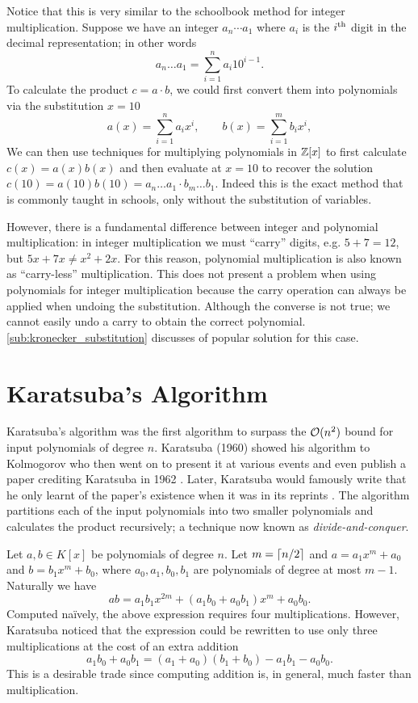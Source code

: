Notice that this is very similar to the schoolbook method for integer multiplication. Suppose we have an integer $a_n \cdots a_1$ where $a_i$ is the $i^\textrm{th}$ digit in the decimal representation; in other words
\[
    a_n \ldots a_1 = \sum^n_{i=1} a_i 10^{i-1}.
\]
To calculate the product $c = a \cdot b$, we could first convert them into polynomials via the substitution $x = 10$
\[
    a(x) = \sum^n_{i=1} a_ix^i, \qquad b(x) = \sum^m_{i=1} b_ix^i,
\]
We can then use techniques for multiplying polynomials in ${\mathbb Z}[x]$ to first calculate $c(x) = a(x)b(x)$ and then evaluate at $x = 10$ to recover the solution $c(10) = a(10)b(10) = a_n\ldots a_1 \cdot b_m\ldots b_1$. Indeed this is the exact method that is commonly taught in schools, only without the substitution of variables.

However, there is a fundamental difference between integer and polynomial multiplication: in integer multiplication we must ``carry'' digits, e.g. $5 + 7 = 12$, but $5x + 7x \neq x^2 + 2x$. For this reason, polynomial multiplication is also known as ``carry-less'' multiplication. This does not present a problem when using polynomials for integer multiplication because the carry operation can always be applied when undoing the substitution. Although the converse is not true; we cannot easily undo a carry to obtain the correct polynomial. \ref{sub:kronecker_substitution} discusses of popular solution for this case.

\section{Karatsuba's Algorithm}
\label{sec:prelim-karatsuba}

Karatsuba's algorithm was the first algorithm to surpass the $\mathcal O(n^2)$ bound for input polynomials of degree $n$. Karatsuba (1960) showed his algorithm to Kolmogorov who then went on to present it at various events and even publish a paper crediting Karatsuba in 1962 \cite{karatsuba}. Later, Karatsuba would famously write that he only learnt of the paper's existence when it was in its reprints \cite{karatsuba1995}. The algorithm partitions each of the input polynomials into two smaller polynomials and calculates the product recursively; a technique now known as \emph{divide-and-conquer}.

Let $a, b \in K[x]$ be polynomials of degree $n$. Let $m = \left \lceil n/2 \right \rceil$ and $a = a_1x^m + a_0$ and $b = b_1x^m + b_0$, where $a_0, a_1, b_0, b_1$ are polynomials of degree at most $m - 1$. Naturally we have
\begin{equation}\label{eq:karatsuba-easy}
    ab = a_1b_1x^{2m} + (a_1b_0 + a_0b_1)x^m + a_0b_0.
\end{equation}
Computed na\"{i}vely, the above expression requires four multiplications. However, Karatsuba noticed that the expression could be rewritten to use only three multiplications at the cost of an extra addition
\begin{equation}\label{eq:karatsuba-trick}
    a_1b_0 + a_0b_1 = (a_1 + a_0)(b_1 + b_0) - a_1b_1 - a_0b_0.
\end{equation}
This is a desirable trade since computing addition is, in general, much faster than multiplication.


